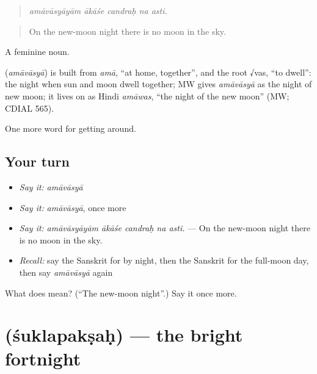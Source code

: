 \begin{quote}
    
\end{quote}

\begin{quote}
\emph{amāvāsyāyām ākāśe candraḥ na asti.}
\end{quote}

\begin{quote}
On the new-moon night there is no moon in the sky.
\end{quote}

A feminine noun.

\begin{cousinweb}
\textbf{} (\emph{amāvāsyā}) is built from \emph{amā}, \textquotedblleft{}at home, together\textquotedblright{}, and the root √vas, \textquotedblleft{}to dwell\textquotedblright{}: the night when sun and moon dwell together; MW gives \emph{amāvāsyā} as the night of new moon; it lives on as Hindi \emph{amāwas}, \textquotedblleft{}the night of the new moon\textquotedblright{} (MW; CDIAL 565).
\end{cousinweb}

\begin{grammarlens}[title={What you've built}]
One more word for getting around.
\end{grammarlens}

\subsection*{Your turn}
\begin{itemize}
\raggedright
  \item \emph{Say it:} \emph{amāvāsyā}
  \item \emph{Say it:} \emph{amāvāsyā}, once more
  \item \emph{Say it:} \emph{amāvāsyāyām ākāśe candraḥ na asti.} — On the new-moon night there is no moon in the sky.
  \item \emph{Recall:} say the Sanskrit for by night, then the Sanskrit for the full-moon day, then say \emph{amāvāsyā} again
\end{itemize}

\begin{tcolorbox}[breakable,colback=teal!4,colframe=teal!35!black,title={Before you move on}]
What does  mean? (\textquotedblleft{}The new-moon night\textquotedblright{}.) Say it once more.
\end{tcolorbox}
\section[\texorpdfstring{\sk{शुक्लपक्षः} (śuklapakṣaḥ)}{शुक्लपक्षः (śuklapakṣaḥ)}]{ (śuklapakṣaḥ) — the bright fortnight}

